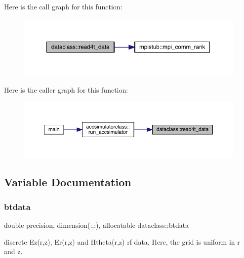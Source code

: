 Here is the call graph for this function\+:\nopagebreak
\begin{figure}[H]
\begin{center}
\leavevmode
\includegraphics[width=350pt]{namespacedataclass_a8159006c3a211e35e4c3e22d94b2abc6_cgraph}
\end{center}
\end{figure}
Here is the caller graph for this function\+:\nopagebreak
\begin{figure}[H]
\begin{center}
\leavevmode
\includegraphics[width=350pt]{namespacedataclass_a8159006c3a211e35e4c3e22d94b2abc6_icgraph}
\end{center}
\end{figure}


\subsection{Variable Documentation}
\mbox{\label{namespacedataclass_a09d27eeab42c3e3369268d8ce133a2c0}} 
\subsubsection{\texorpdfstring{btdata}{btdata}}
{\footnotesize\ttfamily double precision, dimension(\+:,\+:), allocatable dataclass\+::btdata}



discrete Ez(r,z), Er(r,z) and Htheta(r,z) rf data. Here, the grid is uniform in r and z. 

\mbox{\label{namespacedataclass_ad10657f6c8e764ba3c355bd0e2c98a01}} 
